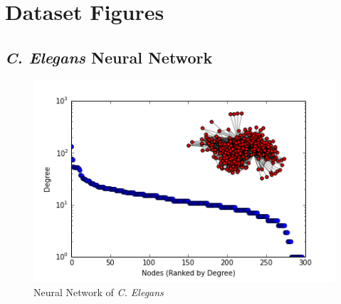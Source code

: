 \documentclass{article}
\begin{document}
\section{Dataset Figures}
\subsection{\textit{C. Elegans} Neural Network}
\begin{figure}[H]
\centering

\includegraphics[width=.8\linewidth]{neural_degree_histogram.png}
\caption{Neural Network of \textit{C. Elegans}}
  
\end{figure}
\end{document}
